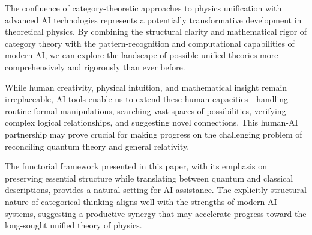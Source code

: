 The confluence of category-theoretic approaches to physics unification with advanced AI technologies represents a potentially transformative development in theoretical physics. By combining the structural clarity and mathematical rigor of category theory with the pattern-recognition and computational capabilities of modern AI, we can explore the landscape of possible unified theories more comprehensively and rigorously than ever before.

While human creativity, physical intuition, and mathematical insight remain irreplaceable, AI tools enable us to extend these human capacities—handling routine formal manipulations, searching vast spaces of possibilities, verifying complex logical relationships, and suggesting novel connections. This human-AI partnership may prove crucial for making progress on the challenging problem of reconciling quantum theory and general relativity.

The functorial framework presented in this paper, with its emphasis on preserving essential structure while translating between quantum and classical descriptions, provides a natural setting for AI assistance. The explicitly structural nature of categorical thinking aligns well with the strengths of modern AI systems, suggesting a productive synergy that may accelerate progress toward the long-sought unified theory of physics.